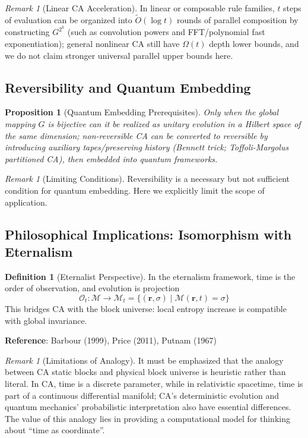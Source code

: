 \documentclass[11pt]{article}
\newtheorem{proposition}[theorem]{Proposition}
\theoremstyle{definition}
\newtheorem{definition}[theorem]{Definition}
\theoremstyle{remark}
\newtheorem{remark}[theorem]{Remark}
\begin{document}
\begin{remark}[Linear CA Acceleration]
In linear or composable rule families, \( t \) steps of evaluation can be organized into \( \tilde{O}(\log t) \) rounds of parallel composition by constructing \( G^{2^k} \) (such as convolution powers and FFT/polynomial fast exponentiation); general nonlinear CA still have \( \Omega(t) \) depth lower bounds, and we do not claim stronger universal parallel upper bounds here.
\end{remark}

\subsection{Reversibility and Quantum Embedding}

\begin{proposition}[Quantum Embedding Prerequisites]\label{prop:quantum}
Only when the global mapping \( G \) is bijective can it be realized as unitary evolution in a Hilbert space of the same dimension; non-reversible CA can be converted to reversible by introducing auxiliary tapes/preserving history (Bennett trick; Toffoli-Margolus partitioned CA), then embedded into quantum frameworks.
\end{proposition}

\begin{remark}[Limiting Conditions]
Reversibility is a necessary but not sufficient condition for quantum embedding. Here we explicitly limit the scope of application.
\end{remark}

\subsection{Philosophical Implications: Isomorphism with Eternalism}

\begin{definition}[Eternalist Perspective]\label{def:eternal}
In the eternalism framework, time is the order of observation, and evolution is projection
\[
\mathcal{O}_t: \mathcal{M} \to \mathcal{M}_t = \{ (\mathbf{r}, \sigma) \mid \mathcal{M}(\mathbf{r}, t) = \sigma \}
\]
This bridges CA with the block universe: local entropy increase is compatible with global invariance.

\textbf{Reference}: Barbour (1999), Price (2011), Putnam (1967)
\end{definition}

\begin{remark}[Limitations of Analogy]
It must be emphasized that the analogy between CA static blocks and physical block universe is heuristic rather than literal. In CA, time is a discrete parameter, while in relativistic spacetime, time is part of a continuous differential manifold; CA's deterministic evolution and quantum mechanics' probabilistic interpretation also have essential differences. The value of this analogy lies in providing a computational model for thinking about ``time as coordinate''.
\end{remark}
\end{document}

